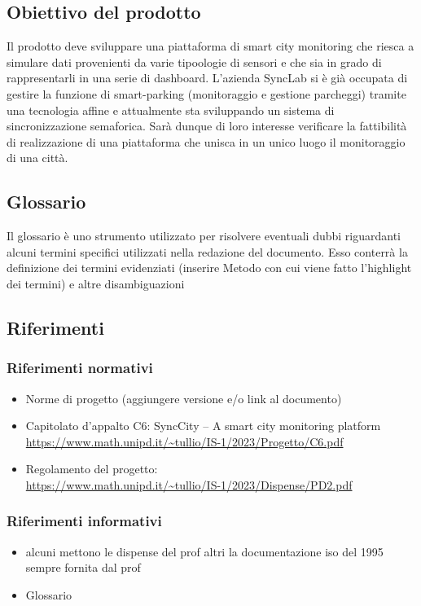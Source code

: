 \documentclass[italian,12pt]{article} %
\begin{document}
\subsection{Obiettivo del prodotto}
Il prodotto deve sviluppare una piattaforma di smart city monitoring 
che riesca a simulare dati provenienti da varie tipoologie di sensori e che sia in grado di 
rappresentarli in una serie di dashboard.
L'azienda SyncLab si è già occupata di gestire la funzione di smart-parking (monitoraggio e gestione parcheggi) 
tramite una tecnologia affine e attualmente sta sviluppando un sistema di sincronizzazione semaforica.
Sarà dunque di loro interesse verificare la fattibilità di realizzazione di una piattaforma 
che unisca in un unico luogo il monitoraggio di una città.

\subsection{Glossario}
Il glossario è uno strumento utilizzato per risolvere eventuali dubbi riguardanti 
alcuni termini specifici utilizzati nella redazione del documento.
Esso conterrà la definizione dei termini evidenziati (inserire Metodo con cui viene fatto l'highlight dei termini)
e altre disambiguazioni 
\subsection{Riferimenti}

\subsubsection{Riferimenti normativi}
\begin{itemize}
    \item Norme di progetto (aggiungere versione e/o link al documento)
    \item Capitolato d'appalto C6: SyncCity – A smart city monitoring platform\\
		  \url{https://www.math.unipd.it/~tullio/IS-1/2023/Progetto/C6.pdf}
    \item Regolamento del progetto:\\
		  \url{https://www.math.unipd.it/~tullio/IS-1/2023/Dispense/PD2.pdf}
\end{itemize}

\subsubsection{Riferimenti informativi}
\begin{itemize}
    \item alcuni mettono le dispense del prof altri la documentazione iso del 1995 
			sempre fornita dal prof
    \item Glossario
\end{itemize}
\end{document}
